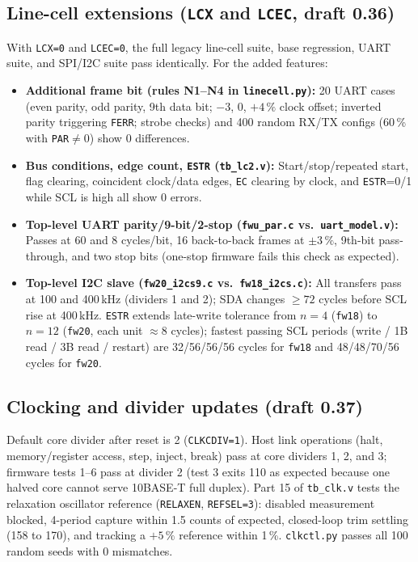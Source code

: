 \documentclass[10pt,a4paper]{article}
\begin{document}
\subsection{Line-cell extensions (\texttt{LCX} and \texttt{LCEC}, draft 0.36)}

With \texttt{LCX=0} and \texttt{LCEC=0}, the full legacy line-cell suite, base regression, UART suite, and
SPI/I2C suite pass identically. For the added features:
\begin{itemize}
\item \textbf{Additional frame bit (rules N1--N4 in \texttt{linecell.py}):} 20 UART cases (even parity, odd parity,
9th data bit; $-3$, $0$, $+4\,\%$ clock offset; inverted parity triggering \texttt{FERR}; strobe checks) and 400 random
RX/TX configs (60\,\% with \texttt{PAR}$\neq 0$) show 0 differences.
\item \textbf{Bus conditions, edge count, \texttt{ESTR} (\texttt{tb\_lc2.v}):} Start/stop/repeated start, flag clearing,
coincident clock/data edges, \texttt{EC} clearing by clock, and \texttt{ESTR}=0/1 while SCL is high all show 0 errors.
\item \textbf{Top-level UART parity/9-bit/2-stop (\texttt{fwu\_par.c} vs.\ \texttt{uart\_model.v}):} Passes at 60 and
8 cycles/bit, 16 back-to-back frames at $\pm 3\,\%$, 9th-bit pass-through, and two stop bits (one-stop firmware fails
this check as expected).
\item \textbf{Top-level I2C slave (\texttt{fw20\_i2cs9.c} vs.\ \texttt{fw18\_i2cs.c}):} All transfers pass at 100 and
400\,kHz (dividers 1 and 2); SDA changes $\ge 72$ cycles before SCL rise at 400\,kHz. \texttt{ESTR} extends late-write
tolerance from $n=4$ (\texttt{fw18}) to $n=12$ (\texttt{fw20}, each unit $\approx 8$ cycles); fastest passing SCL
periods (write / 1B read / 3B read / restart) are 32/56/56/56 cycles for \texttt{fw18} and 48/48/70/56 cycles for
\texttt{fw20}.
\end{itemize}

\subsection{Clocking and divider updates (draft 0.37)}

Default core divider after reset is 2 (\texttt{CLKCDIV=1}). Host link operations (halt, memory/register access, step,
inject, break) pass at core dividers 1, 2, and 3; firmware tests 1--6 pass at divider 2 (test 3 exits 110 as expected
because one halved core cannot serve 10BASE-T full duplex). Part 15 of \texttt{tb\_clk.v} tests the relaxation
oscillator reference (\texttt{RELAXEN}, \texttt{REFSEL=3}): disabled measurement blocked, 4-period capture within 1.5
counts of expected, closed-loop trim settling (158 to 170), and tracking a $+5\,\%$ reference within 1\,\%.
\texttt{clkctl.py} passes all 100 random seeds with 0 mismatches.
\end{document}
